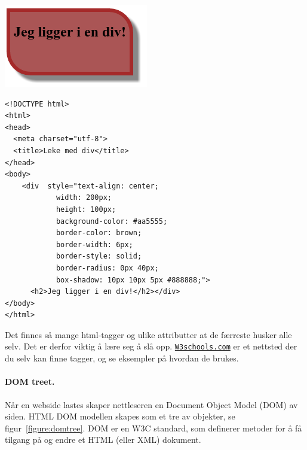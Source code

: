 \documentclass[%
oneside,                 %
final,                   %
12pt]{article}
\newenvironment{notice_mdfboxadmon}[1][]{
\begin{notice_mdfboxmdframed}[frametitle=#1]
}
{
\end{notice_mdfboxmdframed}
}
\begin{document}
\begin{notice_mdfboxadmon}


\centerline{\includegraphics[width=0.5\linewidth]{figures/jeg_ligger_i_en_div.png}}



\begin{verbatim}
<!DOCTYPE html>
<html>
<head>
  <meta charset="utf-8">
  <title>Leke med div</title>
</head>
<body>
	<div  style="text-align: center;
            width: 200px;
            height: 100px;
            background-color: #aa5555;
            border-color: brown;
            border-width: 6px;
            border-style: solid;
            border-radius: 0px 40px;
            box-shadow: 10px 10px 5px #888888;">
      <h2>Jeg ligger i en div!</h2></div>
</body>
</html>
\end{verbatim}
\end{notice_mdfboxadmon}

 

Det finnes så mange html-tagger og ulike attributter at de færreste
husker alle selv. Det er derfor viktig å lære seg å slå
opp. \href{{http://W3schools.com}}{\nolinkurl{W3schools.com}} er et nettsted der du
selv kan finne tagger, og se eksempler på hvordan de brukes.

\paragraph{DOM treet.}

Når en webside lastes skaper nettleseren en Document Object Model
(DOM) av siden. HTML DOM modellen skapes som et tre av objekter, se
figur~\ref{figure:domtree}. DOM er en W3C standard, som definerer
metoder for å få tilgang på og endre et HTML (eller XML) dokument.
\end{document}
